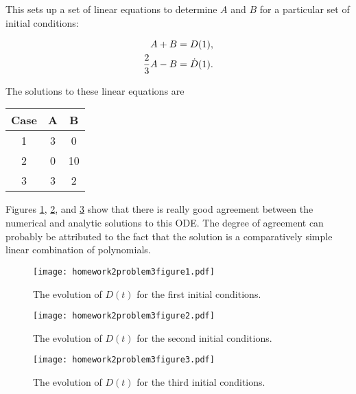 This sets up a set of linear equations to determine $A$ and $B$ for a particular set of initial conditions:

\begin{align}
A + B &= D(1), \\
{2\over 3}A - B &= \dot{D}(1).
\end{align}

The solutions to these linear equations are

\begin{tabular}{c|c|c}
Case & A & B \\
\hline
1 & 3 & 0 \\
2 & 0 & 10 \\
3 & 3 & 2 \\
\end{tabular}

Figures \ref{fig:231}, \ref{fig:232}, and \ref{fig:233} show that there is really good agreement between the numerical and analytic solutions to this ODE. The degree of agreement can probably be attributed to the fact that the solution is a comparatively simple linear combination of polynomials.




\clearpage

\begin{figure}[h]
    \centering
    \texttt{[image: homework2problem3figure1.pdf]}
    \caption{The evolution of $D(t)$ for the first initial conditions.}
    \label{fig:231}
\end{figure}

\begin{figure}[h]
    \centering
    \texttt{[image: homework2problem3figure2.pdf]}
    \caption{The evolution of $D(t)$ for the second initial conditions.}
    \label{fig:232}
\end{figure}

\begin{figure}[h]
    \centering
    \texttt{[image: homework2problem3figure3.pdf]}
    \caption{The evolution of $D(t)$ for the third initial conditions.}
    \label{fig:233}
\end{figure}

\clearpage
